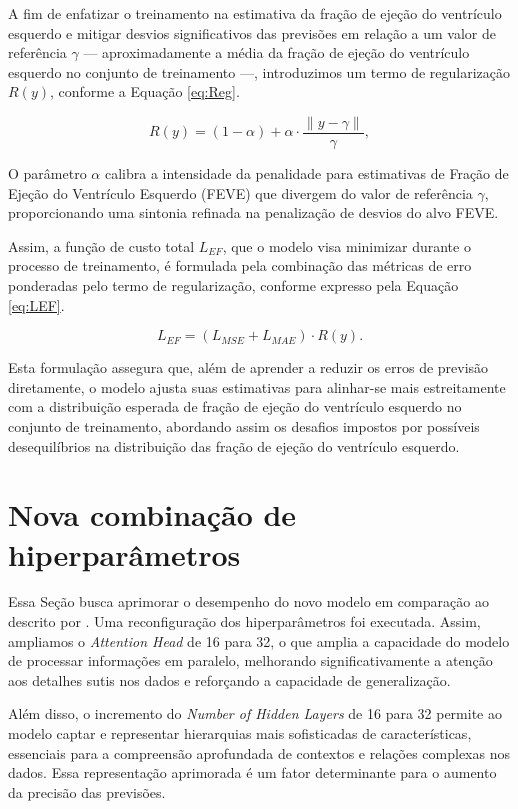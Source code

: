 A fim de enfatizar o treinamento na estimativa da fração de ejeção do ventrículo esquerdo e mitigar desvios significativos das previsões em relação a um valor de referência $\gamma$ — aproximadamente a média da fração de ejeção do ventrículo esquerdo no conjunto de treinamento —, introduzimos um termo de regularização $R(y)$, conforme a Equação \ref{eq:Reg}.

\begin{equation}
R(y) = (1 - \alpha) + \alpha \cdot \frac{\lVert y - \gamma \rVert}{\gamma},
\label{eq:Reg}
\end{equation}

O parâmetro $\alpha$ calibra a intensidade da penalidade para estimativas de Fração de Ejeção do Ventrículo Esquerdo (FEVE) que divergem do valor de referência $\gamma$, proporcionando uma sintonia refinada na penalização de desvios do alvo FEVE.

Assim, a função de custo total $L_{EF}$, que o modelo visa minimizar durante o processo de treinamento, é formulada pela combinação das métricas de erro ponderadas pelo termo de regularização, conforme expresso pela Equação \ref{eq:LEF}.


\begin{equation}
L_{EF} = (L_{MSE} + L_{MAE}) \cdot R(y).
\label{eq:LEF}
\end{equation}

Esta formulação assegura que, além de aprender a reduzir os erros de previsão diretamente, o modelo ajusta suas estimativas para alinhar-se mais estreitamente com a distribuição esperada de fração de ejeção do ventrículo esquerdo no conjunto de treinamento, abordando assim os desafios impostos por possíveis desequilíbrios na distribuição das fração de ejeção do ventrículo esquerdo.

\section{Nova combinação de hiperparâmetros}
\label{Otimização de parâmetros}

Essa Seção busca aprimorar o desempenho do novo modelo em comparação ao descrito por \textcite{Reynald}. Uma reconfiguração dos hiperparâmetros foi executada. Assim, ampliamos o \textit{Attention Head} de 16 para 32, o que amplia a capacidade do modelo de processar informações em paralelo, melhorando significativamente a atenção aos detalhes sutis nos dados e reforçando a capacidade de generalização. 

Além disso, o incremento do \textit{Number of Hidden Layers} de 16 para 32 permite ao modelo captar e representar hierarquias mais sofisticadas de características, essenciais para a compreensão aprofundada de contextos e relações complexas nos dados. Essa representação aprimorada é um fator determinante para o aumento da precisão das previsões.


